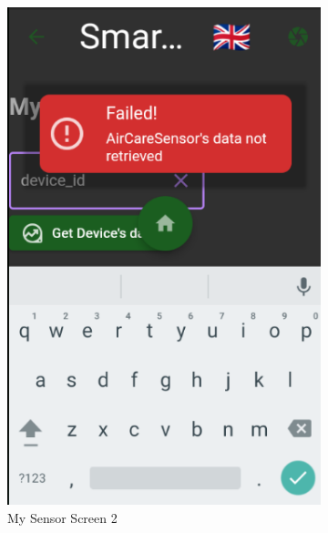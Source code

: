 \documentclass[a4paper,12pt]{report}
\begin{document}
\begin{figure}[H]
\begin{subfigure}{0.3\textwidth}
		\includegraphics[width=\textwidth]{./images/my_sensor/my_sensor_screen2.png}
		\caption{My Sensor Screen 2}
		\label{fig:my_sensor2}
	\end{subfigure}

	\hfill
	\begin{subfigure}{0.3\textwidth}

\end{subfigure}
\end{figure}
\end{document}
